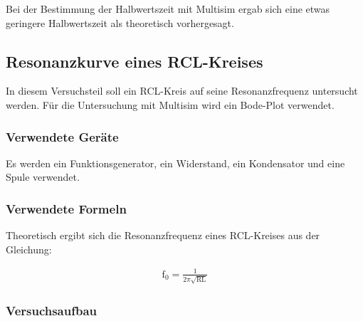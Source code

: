 \documentclass[12pt,a4paper]{article}
\begin{document}
Bei der Bestimmung der Halbwertszeit mit Multisim ergab sich eine etwas geringere Halbwertszeit als theoretisch vorhergesagt.

\subsection{Resonanzkurve eines RCL-Kreises}

In diesem Versuchsteil soll ein RCL-Kreis auf seine Resonanzfrequenz untersucht werden. Für die Untersuchung mit Multisim wird ein Bode-Plot verwendet.

\subsubsection{Verwendete Geräte}

Es werden ein Funktionsgenerator, ein Widerstand, ein Kondensator und eine Spule verwendet.

\subsubsection{Verwendete Formeln}

Theoretisch ergibt sich die Resonanzfrequenz eines RCL-Kreises aus der Gleichung:

\begin{align}
\text{f}_0 = \frac{1}{2 \pi \sqrt{\text{RL}}}
\label{eqn:f0}
\end{align}

\subsubsection{Versuchsaufbau}
\end{document}
